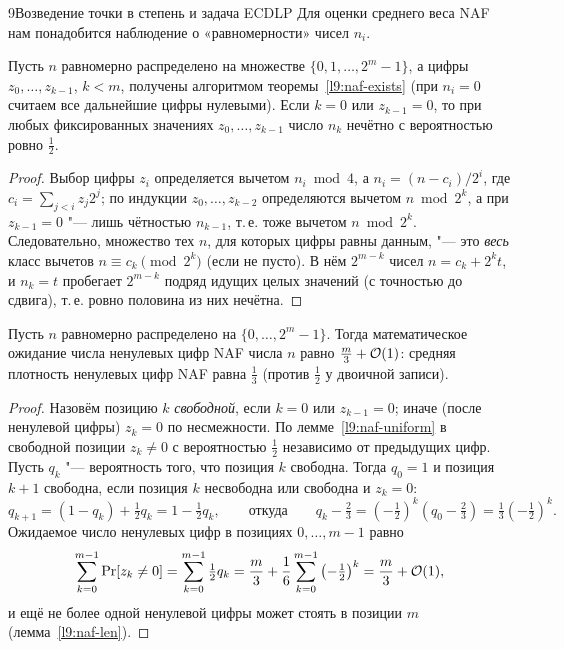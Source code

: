 \begin{lecture}{9}{Возведение точки в степень и задача ECDLP}
Для оценки среднего веса NAF нам понадобится наблюдение о «равномерности» чисел $n_i$.

\begin{lemma}\label{l9:naf-uniform}
Пусть $n$ равномерно распределено на множестве $\{0, 1, \dots, 2^m - 1\}$, а цифры
$z_0, \dots, z_{k-1}$, $k < m$, получены алгоритмом теоремы~\ref{l9:naf-exists} (при $n_i = 0$
считаем все дальнейшие цифры нулевыми). Если $k = 0$ или $z_{k-1} = 0$, то при любых
фиксированных значениях $z_0, \dots, z_{k-1}$ число $n_k$ нечётно с вероятностью ровно $\frac12$.
\end{lemma}

\begin{proof}
Выбор цифры $z_i$ определяется вычетом $n_i \bmod 4$, а $n_i = (n - c_i)/2^i$, где
$c_i = \sum_{j < i} z_j 2^j$; по индукции $z_0, \dots, z_{k-2}$ определяются вычетом
$n \bmod 2^k$, а при $z_{k-1} = 0$ "--- лишь чётностью $n_{k-1}$, т.\,е. тоже вычетом
$n \bmod 2^k$. Следовательно, множество тех $n$, для которых цифры равны данным, "--- это
\emph{весь} класс вычетов $n \equiv c_k \pmod{2^k}$ (если не пусто). В нём $2^{m-k}$ чисел
$n = c_k + 2^k t$, и $n_k = t$ пробегает $2^{m-k}$ подряд идущих целых значений (с точностью
до сдвига), т.\,е. ровно половина из них нечётна.
\end{proof}

\begin{theorem}\label{l9:naf-density}
Пусть $n$ равномерно распределено на $\{0, \dots, 2^m - 1\}$. Тогда математическое ожидание
числа ненулевых цифр NAF числа $n$ равно $\frac m3 + \mathcal{O}(1)$: средняя плотность ненулевых
цифр NAF равна $\frac13$ (против $\frac12$ у двоичной записи).
\end{theorem}

\begin{proof}
Назовём позицию $k$ \emph{свободной}, если $k = 0$ или $z_{k-1} = 0$; иначе (после ненулевой
цифры) $z_k = 0$ по несмежности. По лемме~\ref{l9:naf-uniform} в свободной позиции $z_k \ne 0$
с вероятностью $\frac12$ независимо от предыдущих цифр. Пусть $q_k$ "--- вероятность того,
что позиция $k$ свободна. Тогда $q_0 = 1$ и позиция $k + 1$ свободна, если позиция $k$
несвободна или свободна и $z_k = 0$:
\[
  q_{k+1} = (1 - q_k) + \tfrac12 q_k = 1 - \tfrac12 q_k, \qquad\text{откуда}\qquad
  q_k - \tfrac23 = \left(-\tfrac12\right)^k \left(q_0 - \tfrac23\right) = \tfrac13 \left(-\tfrac12\right)^k.
\]
Ожидаемое число ненулевых цифр в позициях $0, \dots, m - 1$ равно
\[
  \sum_{k=0}^{m-1} \Pr[z_k \ne 0] = \sum_{k=0}^{m-1} \tfrac12 q_k
  = \frac m3 + \frac16 \sum_{k=0}^{m-1} \left(-\tfrac12\right)^k = \frac m3 + \mathcal{O}(1),
\]
и ещё не более одной ненулевой цифры может стоять в позиции $m$ (лемма~\ref{l9:naf-len}).
\end{proof}


\end{lecture}

